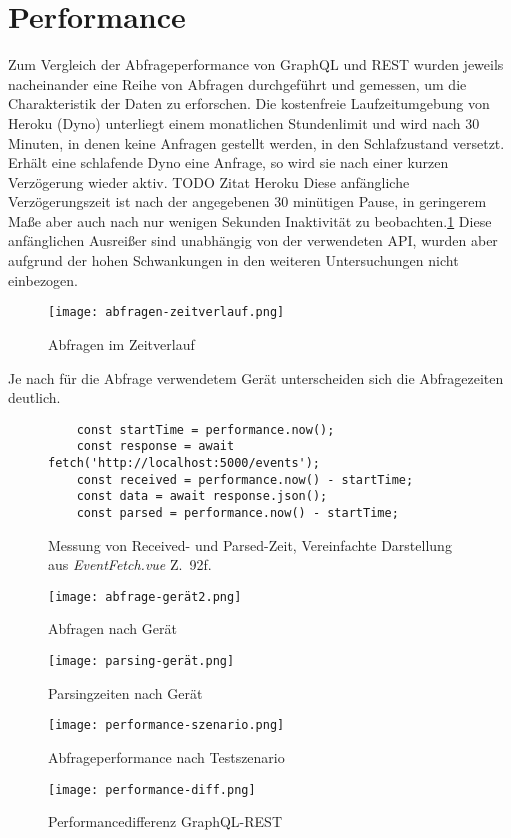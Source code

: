 \section{Performance}
Zum Vergleich der Abfrageperformance von GraphQL und REST wurden jeweils nacheinander eine Reihe von Abfragen durchgeführt und gemessen, um die Charakteristik der Daten zu erforschen.
Die kostenfreie Laufzeitumgebung von Heroku (Dyno) unterliegt einem monatlichen Stundenlimit und wird nach 30 Minuten, in denen keine Anfragen gestellt werden, in den Schlafzustand versetzt.
Erhält eine schlafende Dyno eine Anfrage, so wird sie nach einer kurzen Verzögerung wieder aktiv. TODO Zitat Heroku
Diese anfängliche Verzögerungszeit ist nach der angegebenen 30 minütigen Pause, in geringerem Maße aber auch nach nur wenigen Sekunden Inaktivität zu beobachten.\ref{img:abfrage-zeitverlauf}
Diese anfänglichen Ausreißer sind unabhängig von der verwendeten API, wurden aber aufgrund der hohen Schwankungen in den weiteren Untersuchungen nicht einbezogen. 
\begin{figure}[h!]
  \centering
  \texttt{[image: abfragen-zeitverlauf.png]}
  \caption{Abfragen im Zeitverlauf}\label{img:abfrage-zeitverlauf}
\end{figure}
Je nach für die Abfrage verwendetem Gerät unterscheiden sich die Abfragezeiten deutlich.
\begin{figure}[h]
  \centering
  \begin{verbatim}
    const startTime = performance.now();
    const response = await fetch('http://localhost:5000/events');
    const received = performance.now() - startTime;
    const data = await response.json();
    const parsed = performance.now() - startTime;
  \end{verbatim}
  \caption{Messung von Received- und Parsed-Zeit, Vereinfachte Darstellung aus \emph{EventFetch.vue} Z.~92f.}\label{code:measuring}
\end{figure}
\begin{figure}[h!]
  \centering
  \texttt{[image: abfrage-gerät2.png]}
  \caption{Abfragen nach Gerät}\label{img:abfrage-gerät}
\end{figure}
\begin{figure}[h!]
  \centering
  \texttt{[image: parsing-gerät.png]}
  \caption{Parsingzeiten nach Gerät}\label{img:parsing-gerät}
\end{figure}
\begin{figure}[h!]
  \centering
  \texttt{[image: performance-szenario.png]}
  \caption{Abfrageperformance nach Testszenario}\label{img:performance-szenario}
\end{figure}
\begin{figure}[h!]
  \centering
  \texttt{[image: performance-diff.png]}
  \caption{Performancedifferenz GraphQL-REST}\label{img:performance-diff}
\end{figure}

